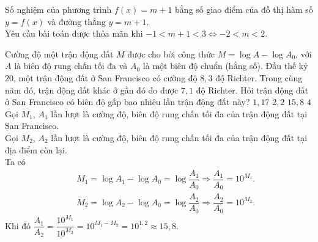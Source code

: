 \begin{ex}%
  {
  }
 \loigiai
  {
  Số nghiệm của phương trình $f(x) = m + 1$ bằng số giao điểm của đồ thị hàm số $y = f(x)$ và đường thẳng $y = m + 1$.\\
  Yêu cầu bài toán được thỏa mãn khi $-1 < m + 1 < 3 \Leftrightarrow -2 < m < 2$.
  }
\end{ex}

\begin{ex}%
 Cường độ một trận động đất $M$ được cho bởi công thức $M = \log A - \log A_0$, với $A$ là biên độ rung chấn tối đa và $A_0$ là một biên độ chuẩn (hằng số). Đầu thế kỷ $20$, một trận động đất ở San Francisco có cường độ $8{,}3$ độ Richter. Trong cùng năm đó, trận động đất khác ở gần đó đo được $7{,}1$ độ Richter. Hỏi trận động đất ở San Francisco có biên độ gấp bao nhiêu lần trận động đất này?
 \choice
  {$1{,}17$}
  {$2{,}2$}
  {\True $15{,}8$}
  {$4$}
 \loigiai
  {
  Gọi $M_1$, $A_1$ lần lượt là cường độ, biên độ rung chấn tối đa của trận động đất tại San Francisco.\\
  Gọi $M_2$, $A_2$ lần lượt là cường độ, biên độ rung chấn tối đa của trận động đất tại địa điểm còn lại.\\
  Ta có
  \begin{eqnarray*}
   && M_1 = \log A_1 - \log A_0 = \log \dfrac{A_1}{A_0}   \Rightarrow  \dfrac{A_1}{A_0}  = 10^{M_1}.\\
   &&M_2 = \log A_2 - \log A_0 = \log \dfrac{A_2}{A_0}    \Rightarrow  \dfrac{A_2}{A_0}  = 10^{M_2}.
  \end{eqnarray*}
  Khi đó $\dfrac{A_1}{A_2} = \dfrac{10^{M_1}}{10^{M_2}} = 10^{M_1 - M_2} = 10^{1{,}2} \approx 15{,}8$.
  }
\end{ex}

